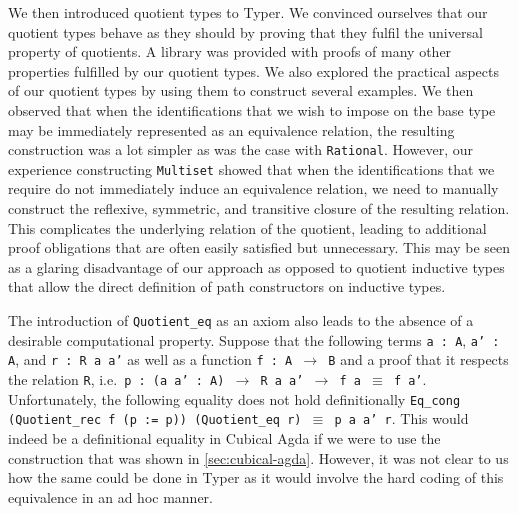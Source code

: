 \documentclass[12pt,twoside,maitrise]{dms}
\theoremstyle{definition}
\numberwithin{equation}{section}
\numberwithin{table}{chapter}
\numberwithin{figure}{chapter}
\newcommand\id[1] {\texttt{#1}}
\newcommand\fn[1] {\texttt{#1}}
\begin{document}
We then introduced quotient types to Typer. We convinced ourselves that our
quotient types behave as they should by proving that they fulfil the universal
property of quotients. A library was provided with proofs of many other
properties fulfilled by our quotient types. We also explored the practical
aspects of our quotient types by using them to construct several examples. We
then observed that when the identifications that we wish to impose on the base
type may be immediately represented as an equivalence relation, the resulting
construction was a lot simpler as was the case with \id{Rational}. However, our
experience constructing \id{Multiset} showed that when the identifications that
we require do not immediately induce an equivalence relation, we need to
manually construct the reflexive, symmetric, and transitive closure of the
resulting relation. This complicates the underlying relation of the quotient,
leading to additional proof obligations that are often easily satisfied but
unnecessary. This may be seen as a glaring disadvantage of our approach as
opposed to quotient inductive types that allow the direct definition of path
constructors on inductive types.

The introduction of \id{Quotient\_eq} as an axiom also leads to the absence of a
desirable computational property. Suppose that the following terms \fn{a : A},
\fn{a' : A}, and \fn{r : R a a'} as well as a function \fn{f : A $\rightarrow$
  B} and a proof that it respects the relation \id{R}, i.e.\ \fn{p : (a a' : A)
  $\rightarrow$ R a a' $\rightarrow$ f a $\equiv$ f a'}. Unfortunately, the
following equality does not hold definitionally \fn{Eq\_cong (Quotient\_rec f (p
  := p)) (Quotient\_eq r) $\equiv$ p a a' r}. This would indeed be a
definitional equality in Cubical Agda if we were to use the construction that
was shown in \autoref{sec:cubical-agda}. However, it was not clear to us how the
same could be done in Typer as it would involve the hard coding of this
equivalence in an ad hoc manner.
\end{document}
